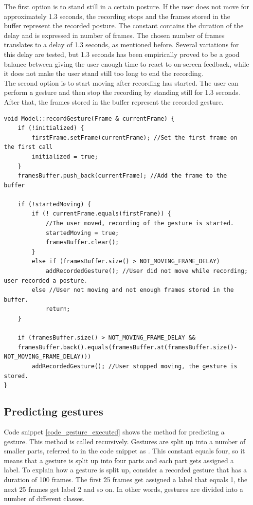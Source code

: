 The first option is to stand still in a certain posture. If the user does not move for approximately 1.3 seconds, the recording stops and the frames stored in the buffer represent the recorded posture. The constant  contains the duration of the delay and is expressed in number of frames. The chosen number of frames translates to a delay of 1.3 seconds, as mentioned before. Several variations for this delay are tested, but 1.3 seconds has been empirically proved to be a good balance between giving the user enough time to react to on-screen feedback, while it does not make the user stand still too long to end the recording.\\

The second option is to start moving after recording has started. The user can perform a gesture and then stop the recording by standing still for 1.3 seconds. After that, the frames stored in the buffer represent the recorded gesture.\\

\begin{lstlisting}[caption=method to record a gesture, label=code_record_gesture]
void Model::recordGesture(Frame & currentFrame) {
	if (!initialized) {
		firstFrame.setFrame(currentFrame); //Set the first frame on the first call
		initialized = true;
	}
	framesBuffer.push_back(currentFrame); //Add the frame to the buffer

	if (!startedMoving) {
		if (! currentFrame.equals(firstFrame)) {
			//The user moved, recording of the gesture is started.
			startedMoving = true;
			framesBuffer.clear();
		}
		else if (framesBuffer.size() > NOT_MOVING_FRAME_DELAY)
			addRecordedGesture(); //User did not move while recording; user recorded a posture.
		else //User not moving and not enough frames stored in the buffer.
			return;
	}

	if (framesBuffer.size() > NOT_MOVING_FRAME_DELAY &&
	framesBuffer.back().equals(framesBuffer.at(framesBuffer.size()-NOT_MOVING_FRAME_DELAY)))
		addRecordedGesture(); //User stopped moving, the gesture is stored.
}
\end{lstlisting}


\subsection{Predicting gestures}

Code snippet \ref{code_gesture_executed} shows the method for predicting a gesture. This method is called recursively. Gestures are split up into a number of smaller parts, referred to in the code snippet as . This constant equals four, so it means that a gesture is split up into four parts and each part gets assigned a label. To explain how a gesture is split up, consider a recorded gesture that has a duration of 100 frames. The first 25 frames get assigned a label that equals 1, the next 25 frames get label 2 and so on. In other words, gestures are divided into a number of different classes.\\

